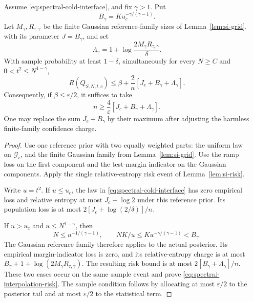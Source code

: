 \begin{corollary}
\label{cor:spectral-interpolation}
Assume \eqref{eq:spectral-cold-interface}, and fix $\gamma>1$.
Put
\[
 B_\gamma=K u_c^{-\gamma/(\gamma-1)}.
\]
Let $M_\gamma,R_{\tau,\gamma}$ be the finite Gaussian reference-family
sizes of Lemma~\ref{lem:si-grid}, with its parameter $J=B_\gamma$, and
set
\[
 \Lambda_\gamma=1+
     \log\frac{2M_\gamma R_{\tau,\gamma}}{\delta}.
\]
With sample probability at least $1-\delta$, simultaneously for every
$N\ge C$ and $0<t^2\le N^{1-\gamma}$,
\begin{equation}\label{eq:spectral-interpolation-risk}
 R(Q_{S,N,t,c})\le\beta+
             \frac2n[J_c+B_\gamma+\Lambda_\gamma].
\end{equation}
Consequently, if $\beta\le\varepsilon/2$, it suffices to take
\begin{equation}\label{eq:spectral-interpolation-samples}
 n\ge\frac4\varepsilon
       [J_c+B_\gamma+\Lambda_\gamma].
\end{equation}
One may replace the sum $J_c+B_\gamma$ by their maximum after
adjusting the harmless finite-family confidence charge.
\end{corollary}
\begin{proof}
Use one reference prior with two equally weighted parts: the uniform
law on $\mathcal G_c$, and the finite Gaussian family from
Lemma~\ref{lem:si-grid}. Use the ramp loss on the first component and
the test-margin indicator on the Gaussian components. Apply the single
relative-entropy risk event of Lemma~\ref{lem:si-risk}.

Write $u=t^2$. If $u\le u_c$, the law in
\eqref{eq:spectral-cold-interface} has zero empirical loss and relative
entropy at most $J_c+\log2$ under this reference prior. Its population
loss is at most $2[J_c+\log(2/\delta)]/n$.

If $u>u_c$ and $u\le N^{1-\gamma}$, then
\[
 N\le u^{-1/(\gamma-1)},\qquad
 NK/u\le K u^{-\gamma/(\gamma-1)}<B_\gamma.
\]
The Gaussian reference family therefore applies to the actual posterior.
Its empirical margin-indicator loss is zero, and its relative-entropy
charge is at most
$B_\gamma+1+\log(2M_\gamma R_{\tau,\gamma})$.
The resulting risk bound is at most
$2[B_\gamma+\Lambda_\gamma]/n$.
These two cases occur on the same sample event and prove
\eqref{eq:spectral-interpolation-risk}. The sample condition follows
by allocating at most $\varepsilon/2$ to the posterior tail and at
most $\varepsilon/2$ to the statistical term.
\end{proof}

